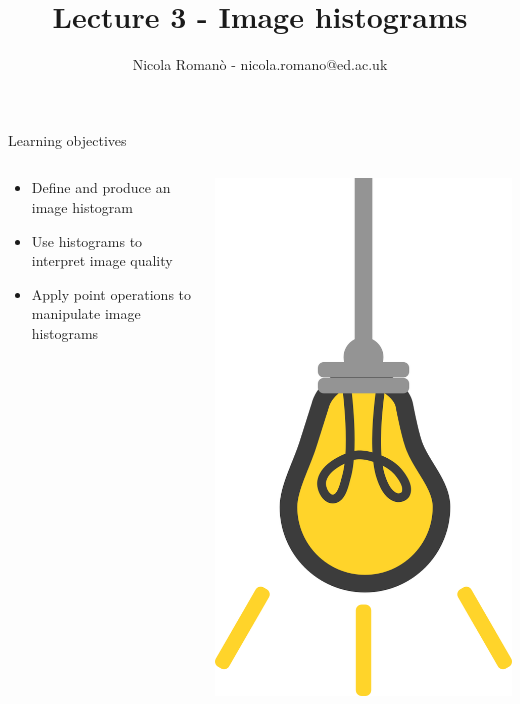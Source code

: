 \documentclass[9pt, aspectratio=169]{beamer}
\author{Nicola Romanò - nicola.romano@ed.ac.uk}
\title{Lecture 3 - Image histograms}
\date{}
\begin{document}

\begin{frame}
    \titlepage
\end{frame}

\begin{frame}
    {Learning objectives}
    \begin{columns}
        \begin{column}{0.8\textwidth}
            \begin{itemize}
                \item Define and produce an image histogram
                \item Use histograms to interpret image quality
                \item Apply point operations to manipulate image histograms
            \end{itemize}
        \end{column}
        \begin{column}{0.2\textwidth}
            \includegraphics[angle=-30, origin=tr, width=1.5\textwidth]{lightbulb.png}

\end{column}
\end{columns}
\end{frame}
\end{document}
